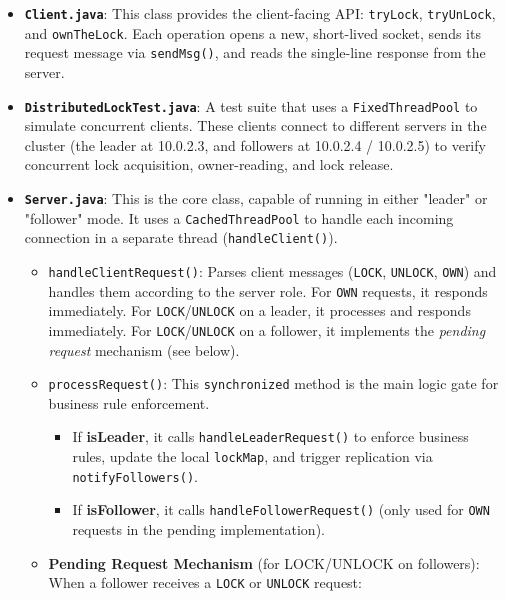 \documentclass[a4paper,11pt]{article}
\begin{document}
\begin{itemize}
    \item \textbf{\texttt{Client.java}}: This class provides the client-facing API: \texttt{tryLock}, \texttt{tryUnLock}, and \texttt{ownTheLock}. Each operation opens a new, short-lived socket, sends its request message via \texttt{sendMsg()}, and reads the single-line response from the server.

    \item \textbf{\texttt{DistributedLockTest.java}}: A test suite that uses a \texttt{FixedThreadPool} to simulate concurrent clients. These clients connect to different servers in the cluster (the leader at 10.0.2.3, and followers at 10.0.2.4 / 10.0.2.5) to verify concurrent lock acquisition, owner-reading, and lock release.
    
    \item \textbf{\texttt{Server.java}}: This is the core class, capable of running in either "leader" or "follower" mode. It uses a \texttt{CachedThreadPool} to handle each incoming connection in a separate thread (\texttt{handleClient()}).
        \begin{itemize}
            \item \texttt{handleClientRequest()}: Parses client messages (\texttt{LOCK}, \texttt{UNLOCK}, \texttt{OWN}) and handles them according to the server role. For \texttt{OWN} requests, it responds immediately. For \texttt{LOCK}/\texttt{UNLOCK} on a leader, it processes and responds immediately. For \texttt{LOCK}/\texttt{UNLOCK} on a follower, it implements the \emph{pending request} mechanism (see below).
            \item \texttt{processRequest()}: This \texttt{synchronized} method is the main logic gate for business rule enforcement.
                \begin{itemize}
                    \item If \textbf{isLeader}, it calls \texttt{handleLeaderRequest()} to enforce business rules, update the local \texttt{lockMap}, and trigger replication via \texttt{notifyFollowers()}.
                    \item If \textbf{isFollower}, it calls \texttt{handleFollowerRequest()} (only used for \texttt{OWN} requests in the pending implementation).
                \end{itemize}
            \item \textbf{Pending Request Mechanism} (for LOCK/UNLOCK on followers): When a follower receives a \texttt{LOCK} or \texttt{UNLOCK} request:

\end{itemize}
\end{itemize}
\end{document}
